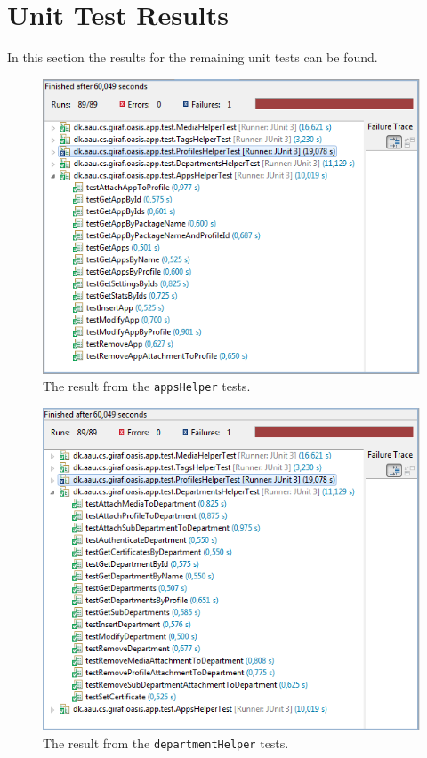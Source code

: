 \chapter{Unit Test Results}
\label{app:unitTestResults}
In this section the results for the remaining unit tests can be found.

\begin{figure}[H]
	\centering
		\includegraphics[width=\textwidth]{Images/unit_testing/app_helper_tests.PNG}
	\caption{The result from the \texttt{appsHelper} tests.}
	\label{fig:app_helper_tests}
\end{figure}

\begin{figure}[H]
	\centering
		\includegraphics[width=\textwidth]{Images/unit_testing/department_helper_tests.PNG}
	\caption{The result from the \texttt{departmentHelper} tests.}
	\label{fig:department_helper_tests}
\end{figure}

